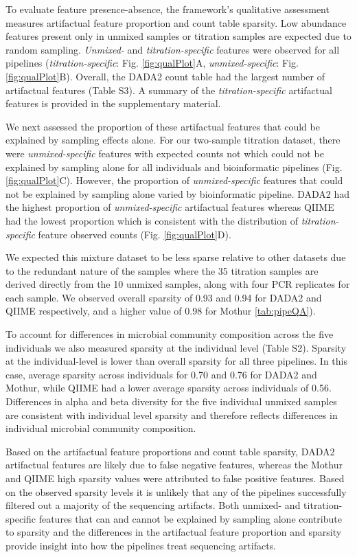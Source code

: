 \documentclass{bmcart}
\begin{document}
To evaluate feature presence-absence, the framework's qualitative assessment measures
artifactual feature proportion and count table sparsity.
Low abundance features
present only in unmixed samples or titration samples are expected due to random
sampling. \emph{Unmixed-} and \emph{titration-specific} features were observed for all pipelines
(\emph{titration-specific}: Fig. \ref{fig:qualPlot}A, \emph{unmixed-specific}: Fig.
\ref{fig:qualPlot}B). Overall, the DADA2 count table had the largest
number of artifactual features (Table S3). 
A summary of the \emph{titration-specific} artifactual features is provided in the supplementary material.

We next assessed the proportion of these artifactual features that could be explained by sampling effects alone. For our two-sample titration dataset, there were
\emph{unmixed-specific} features with expected counts not which could not be explained by sampling
alone for all individuals and bioinformatic pipelines (Fig.
\ref{fig:qualPlot}C). However, the proportion of \emph{unmixed-specific}
features that could not be explained by sampling alone varied by
bioinformatic pipeline. DADA2 had the highest proportion of
\emph{unmixed-specific} artifactual features whereas QIIME had
the lowest proportion which is consistent with the distribution
of \emph{titration-specific} feature observed counts (Fig. \ref{fig:qualPlot}D).

We expected this mixture dataset to be less sparse relative to other datasets due
to the redundant nature of the samples where the 35 titration samples are derived
directly from the 10 unmixed samples, along with four PCR replicates for
each sample. We observed overall sparsity of 0.93 and 0.94 for DADA2 and QIIME respectively, and a higher value of 0.98 for Mothur \ref{tab:pipeQA}). 

To account for differences in microbial community composition across the five individuals we also measured sparsity at the individual level (Table S2).
Sparsity at the individual-level is lower than overall sparsity for all three pipelines. In this case, average sparsity across individuals for 0.70 and 0.76 for DADA2 and Mothur, while QIIME had a lower average sparsity across individuals of 0.56. Differences in alpha and beta diversity for the five individual unmixed samples are consistent with individual level sparsity and therefore reflects differences in individual microbial community composition.


Based on the artifactual feature proportions and count table sparsity, 
DADA2 artifactual features are likely due to false negative features, whereas the Mothur and QIIME high sparsity values were attributed to false positive features. Based on the observed sparsity levels it is unlikely that any of the pipelines successfully filtered out a
majority of the sequencing artifacts. Both unmixed- and titration-specific
features that can and cannot be explained by sampling alone contribute
to sparsity and the differences in the artifactual feature proportion
and sparsity provide insight into how the pipelines treat sequencing artifacts.
\end{document}
